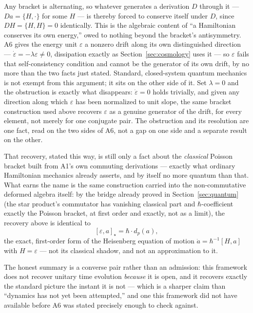 \documentclass[aps,prd,twocolumn,superscriptaddress,nofootinbib]{revtex4-2}
\begin{document}
Any bracket is alternating, so whatever generates a derivation $D$ through
it — $Da = \{H,\cdot\}$ for some $H$ — is thereby forced to conserve
itself under $D$, since $DH=\{H,H\}=0$ identically. This is the algebraic
content of ``a Hamiltonian conserves its own energy,'' owed to nothing
beyond the bracket's antisymmetry. A6 gives the energy unit $\varepsilon$
a nonzero drift along its own distinguished direction —
$\dot\varepsilon=-\lambda\varepsilon\ne0$, dissipation exactly as
Section~\ref{sec:cosmology} uses it — so $\varepsilon$ fails that
self-consistency condition and cannot be the generator of its own drift,
by no more than the two facts just stated. Standard, closed-system
quantum mechanics is not exempt from this argument; it sits on the other
side of it. Set $\lambda=0$ and the obstruction is exactly what
disappears: $\dot\varepsilon=0$ holds trivially, and given any direction
along which $\varepsilon$ has been normalized to unit slope, the same
bracket construction used above recovers $\varepsilon$ as a genuine
generator of the drift, for every element, not merely for one conjugate
pair. The obstruction and its resolution are one fact, read on the two
sides of A6, not a gap on one side and a separate result on the other.

That recovery, stated this way, is still only a fact about the
\emph{classical} Poisson bracket built from A1's own commuting
derivations — exactly what ordinary Hamiltonian mechanics already
asserts, and by itself no more quantum than that. What earns the name is
the same construction carried into the non-commutative deformed algebra
itself: by the bridge already proved in Section~\ref{sec:quantum}
(the star product's commutator has vanishing classical part and
$\hbar$-coefficient exactly the Poisson bracket, at first order and
exactly, not as a limit), the recovery above is identical to
\[
[\varepsilon,a]_\star = \hbar\cdot d_p(a),
\]
the exact, first-order form of the Heisenberg equation of motion
$\dot a=\hbar^{-1}[H,a]$ with $H=\varepsilon$ — not its classical shadow,
and not an approximation to it.

The honest summary is a converse pair rather than an admission: this
framework does not recover unitary time evolution \emph{because} it is
open, and it recovers exactly the standard picture the instant it is not
— which is a sharper claim than ``dynamics has not yet been attempted,''
and one this framework did not have available before A6 was stated
precisely enough to check against.

\end{document}
